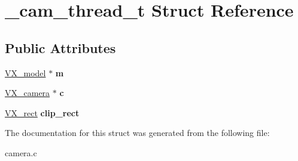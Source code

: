 \hypertarget{struct__cam__thread__t}{\section{\-\_\-cam\-\_\-thread\-\_\-t Struct Reference}
\label{struct__cam__thread__t}
}
\subsection*{Public Attributes}
\begin{DoxyCompactItemize}
\item 
\hypertarget{struct__cam__thread__t_a806c7d90a2e34f5fbd439a7e228ad276}{\hyperlink{structVX__model}{V\-X\-\_\-model} $\ast$ {\bfseries m}}\label{struct__cam__thread__t_a806c7d90a2e34f5fbd439a7e228ad276}

\item 
\hypertarget{struct__cam__thread__t_a5729c25c27b693dc62425f5f9543c457}{\hyperlink{structVX__camera}{V\-X\-\_\-camera} $\ast$ {\bfseries c}}\label{struct__cam__thread__t_a5729c25c27b693dc62425f5f9543c457}

\item 
\hypertarget{struct__cam__thread__t_a6acbc1fe7d3bf249b0913763631634bb}{\hyperlink{structVX__rect}{V\-X\-\_\-rect} {\bfseries clip\-\_\-rect}}\label{struct__cam__thread__t_a6acbc1fe7d3bf249b0913763631634bb}

\end{DoxyCompactItemize}


The documentation for this struct was generated from the following file\-:\begin{DoxyCompactItemize}
\item 
camera.\-c\end{DoxyCompactItemize}
